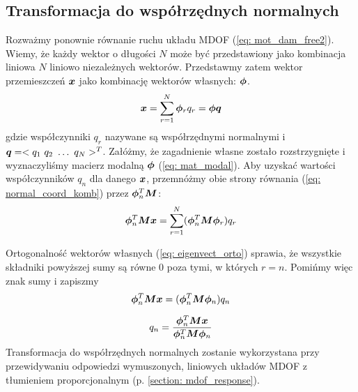 \subsection{Transformacja do współrzędnych normalnych} \label{section: transform_normal}
Rozważmy ponownie równanie ruchu układu MDOF (\ref{eq: mot_dam_free2}). Wiemy, że każdy wektor o długości $N$ może być przedstawiony jako kombinacja liniowa $N$ liniowo niezależnych wektorów. Przedstawmy zatem wektor przemieszczeń $\bm{x}$ jako kombinację wektorów własnych: $\bm{\phi}$.
\begin{equation} \label{eq: normal_coord_komb}
	\bm{x} = \sum_{r=1}^{N} \bm{\phi}_r q_r=\bm{\phi q}
\end{equation} 
gdzie współczynniki $q_r$ nazywane są współrzędnymi normalnymi  i $\bm{q}=<q_1\,\,q_2\,\, \dots\,\, q_N>^T$. Załóżmy, że zagadnienie własne zostało rozstrzygnięte i wyznaczyliśmy macierz modalną $\bm{\phi}$ (\ref{eq: mat_modal}). Aby uzyskać wartości współczynników $q_n$ dla danego $\bm{x}$, przemnóżmy obie strony równania (\ref{eq: normal_coord_komb}) przez $\bm{\phi}_n^T\bm{M}$:
\begin{equation} \label{eq: normal_coord_komb2}
	\bm{\phi}_n^T\bm{M}\bm{x} = \sum_{r=1}^{N} (\bm{\phi}_n^T\bm{M}\bm{\phi}_r) q_r
\end{equation} 

Ortogonalność wektorów własnych (\ref{eq: eigenvect_orto}) sprawia, że wszystkie składniki powyższej sumy są równe 0 poza tymi, w których $r=n$. Pomińmy więc znak sumy i zapiszmy 
\begin{equation} \label{eq: normal_coord_kom3}
	\bm{\phi}_n^T\bm{M}\bm{x} = (\bm{\phi}_n^T\bm{M}\bm{\phi}_n) q_n
\end{equation} 

\begin{equation} \label{eq: normal_coord_kom4}
	q_n = \frac{\bm{\phi}_n^T\bm{M}\bm{x}}{\bm{\phi}_n^T\bm{M}\bm{\phi}_n} 
\end{equation} 
Transformacja do współrzędnych normalnych zostanie wykorzystana przy przewidywaniu odpowiedzi wymuszonych, liniowych układów MDOF z tłumieniem proporcjonalnym (p. \ref{section: mdof_response}).

